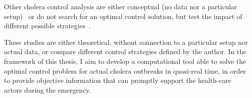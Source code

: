 Other cholera control analysis are either conceptual (no data nor a particular setup)~\cite{fister_optimal_2016} or do not search for an optimal control solution, but test the impact of different possible  strategies~\cite{kirpich_controlling_2017, eubank_modelling_2004, finger_potential_2018, seidlein_preventing_2018,azman_micro-hotspots_2018,lessler_mapping_2018,rebaudet_dry_2013}.

These studies are either theoretical, without connection to a particular setup nor actual data, or compare different control strategies defined by the author. In the framework of this thesis, I aim to develop a computational tool able to solve the optimal control problem for actual cholera outbreaks in quasi-real time, in order to provide objective information that can promptly support the health-care actors during the emergency. 
